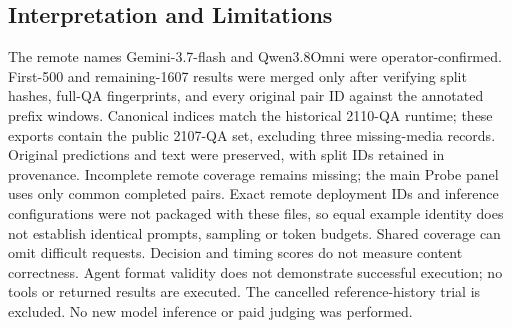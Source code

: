 \subsection{Interpretation and Limitations}

The remote names Gemini-3.7-flash and Qwen3.8Omni were operator-confirmed. First-500 and remaining-1607 results were merged only after verifying split hashes, full-QA fingerprints, and every original pair ID against the annotated prefix windows. Canonical indices match the historical 2110-QA runtime; these exports contain the public 2107-QA set, excluding three missing-media records. Original predictions and text were preserved, with split IDs retained in provenance. Incomplete remote coverage remains missing; the main Probe panel uses only common completed pairs. Exact remote deployment IDs and inference configurations were not packaged with these files, so equal example identity does not establish identical prompts, sampling or token budgets. Shared coverage can omit difficult requests. Decision and timing scores do not measure content correctness. Agent format validity does not demonstrate successful execution; no tools or returned results are executed. The cancelled reference-history trial is excluded. No new model inference or paid judging was performed.

